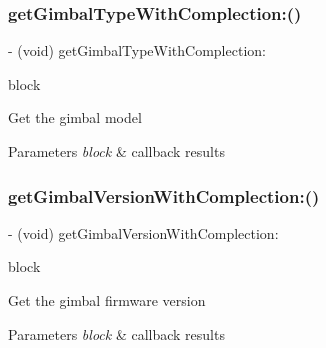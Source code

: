 \subsubsection{\texorpdfstring{get\+Gimbal\+Type\+With\+Complection\+:()}{getGimbalTypeWithComplection:()}}
{\footnotesize\ttfamily -\/ (void) get\+Gimbal\+Type\+With\+Complection\+: \begin{DoxyParamCaption}\item[{(void($^\wedge$)(P\+V\+Gimbal\+Type gimbal\+Type, N\+S\+Error $\ast$\hyperlink{group___p_v_s_d_k___c_o_r_e___a_p_i___m_o_u_n_t_c_o_n_t_r_o_l_ga5a1de33b230662127568783314b4a54d}{\+\_\+\+Nullable} error))}]{block }\end{DoxyParamCaption}}

Get the gimbal model


\begin{DoxyParams}{Parameters}
{\em block} & callback results \\
\hline
\end{DoxyParams}
\mbox{\label{interface_p_v_gimabal_ab7f782bde28693b3647bd48694f3d3f1}} 
\subsubsection{\texorpdfstring{get\+Gimbal\+Version\+With\+Complection\+:()}{getGimbalVersionWithComplection:()}}
{\footnotesize\ttfamily -\/ (void) get\+Gimbal\+Version\+With\+Complection\+: \begin{DoxyParamCaption}\item[{(void($^\wedge$)(int version, N\+S\+Error $\ast$\hyperlink{group___p_v_s_d_k___c_o_r_e___a_p_i___m_o_u_n_t_c_o_n_t_r_o_l_ga5a1de33b230662127568783314b4a54d}{\+\_\+\+Nullable} error))}]{block }\end{DoxyParamCaption}}

Get the gimbal firmware version


\begin{DoxyParams}{Parameters}
{\em block} & callback results \\
\hline
\end{DoxyParams}
\mbox{\label{interface_p_v_gimabal_a2f1444c7c893cbea743e15eced590672}} 
